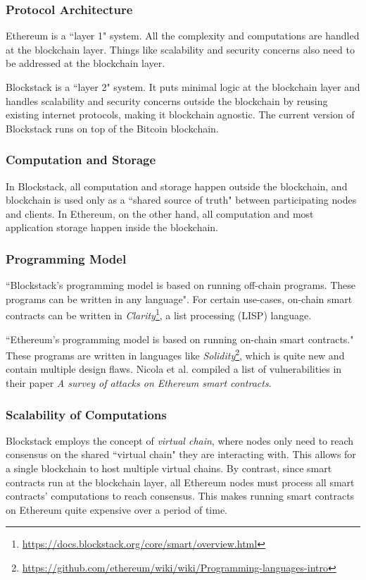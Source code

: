 			\subsubsection{Protocol Architecture}
			Ethereum is a ``layer 1" system. All the complexity and computations are handled at the blockchain layer. Things like scalability and security concerns also need to be addressed at the blockchain layer. 
			
			Blockstack is a ``layer 2" system. It puts minimal logic at the blockchain layer and handles scalability and security concerns outside the blockchain by reusing existing internet protocols, making it blockchain agnostic. The current version of Blockstack runs on top of the Bitcoin blockchain.
			
			\subsubsection{Computation and Storage}
			In Blockstack, all computation and storage happen outside the blockchain, and blockchain is used only as a ``shared source of truth" between participating nodes and clients. In Ethereum, on the other hand, all computation and most application storage happen inside the blockchain.
			
			\subsubsection{Programming Model}
			``Blockstack's programming model is based on running off-chain programs. These programs can be written in any language". For certain use-cases, on-chain smart contracts can be written in \textit{Clarity}\footnote{\url{https://docs.blockstack.org/core/smart/overview.html}}, a list processing (LISP) language.
			
			``Ethereum's programming model is based on running on-chain smart contracts." These programs are written in languages like \textit{Solidity}\footnote{\url{https://github.com/ethereum/wiki/wiki/Programming-languages-intro}}, which is quite new and contain multiple design flaws. Nicola et al. compiled a list of vulnerabilities in their paper \textit{A survey of attacks on Ethereum smart contracts}\cite{atzei2016survey}.
			
			\subsubsection{Scalability of Computations}
			Blockstack employs the concept of \textit{virtual chain}\cite{nelson2016extending}, where nodes only need to reach consensus on the shared ``virtual chain" they are interacting with. This allows for a single blockchain to host multiple virtual chains. By contrast, since smart contracts run at the blockchain layer, all Ethereum nodes must process all smart contracts' computations to reach consensus. This makes running smart contracts on Ethereum quite expensive over a period of time.
			
